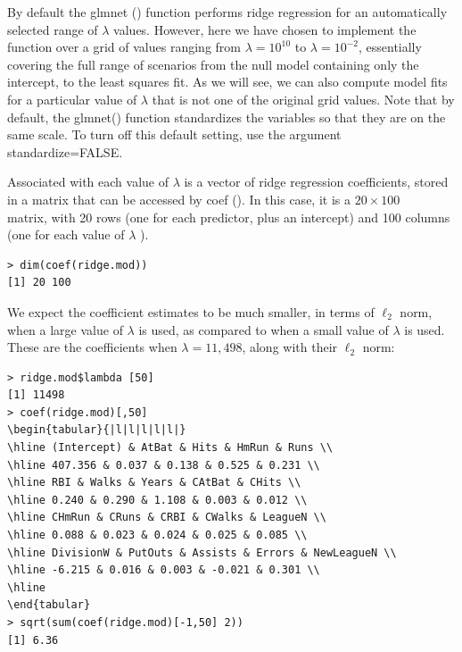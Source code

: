 \documentclass[10pt]{article}
\begin{document}
By default the glmnet () function performs ridge regression for an automatically selected range of $\lambda$ values. However, here we have chosen to implement the function over a grid of values ranging from $\lambda=10^{10}$ to $\lambda=10^{-2}$, essentially covering the full range of scenarios from the null model containing only the intercept, to the least squares fit. As we will see, we can also compute model fits for a particular value of $\lambda$ that is not one of the original grid values. Note that by default, the glmnet() function standardizes the variables so that they are on the same scale. To turn off this default setting, use the argument standardize=FALSE.

Associated with each value of $\lambda$ is a vector of ridge regression coefficients, stored in a matrix that can be accessed by coef (). In this case, it is a $20 \times 100$\\
matrix, with 20 rows (one for each predictor, plus an intercept) and 100 columns (one for each value of $\lambda$ ).

\begin{verbatim}
> dim(coef(ridge.mod))
[1] 20 100
\end{verbatim}

We expect the coefficient estimates to be much smaller, in terms of $\ell_{2}$ norm, when a large value of $\lambda$ is used, as compared to when a small value of $\lambda$ is used. These are the coefficients when $\lambda=11,498$, along with their $\ell_{2}$ norm:

\begin{verbatim}
> ridge.mod$lambda [50]
[1] 11498
> coef(ridge.mod)[,50]
\begin{tabular}{|l|l|l|l|l|}
\hline (Intercept) & AtBat & Hits & HmRun & Runs \\
\hline 407.356 & 0.037 & 0.138 & 0.525 & 0.231 \\
\hline RBI & Walks & Years & CAtBat & CHits \\
\hline 0.240 & 0.290 & 1.108 & 0.003 & 0.012 \\
\hline CHmRun & CRuns & CRBI & CWalks & LeagueN \\
\hline 0.088 & 0.023 & 0.024 & 0.025 & 0.085 \\
\hline DivisionW & PutOuts & Assists & Errors & NewLeagueN \\
\hline -6.215 & 0.016 & 0.003 & -0.021 & 0.301 \\
\hline
\end{tabular}
> sqrt(sum(coef(ridge.mod)[-1,50] 2))
[1] 6.36
\end{verbatim}
\end{document}
